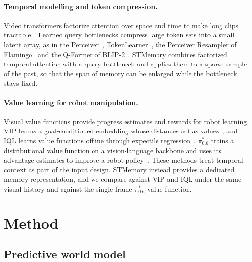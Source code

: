 \documentclass[10pt,a4paper]{article}
\begin{document}
\paragraph{Temporal modelling and token compression.}
Video transformers factorize attention over space and time to make long clips tractable~\citep{arnab2021vivit,bertasius2021timesformer}. Learned query bottlenecks compress large token sets into a small latent array, as in the Perceiver~\citep{jaegle2021perceiver}, TokenLearner~\citep{ryoo2021tokenlearner}, the Perceiver Resampler of Flamingo~\citep{alayrac2022flamingo} and the Q-Former of BLIP-2~\citep{li2023blip2}. STMemory combines factorized temporal attention with a query bottleneck and applies them to a sparse sample of the past, so that the span of memory can be enlarged while the bottleneck stays fixed.

\paragraph{Value learning for robot manipulation.}
Visual value functions provide progress estimates and rewards for robot learning. VIP learns a goal-conditioned embedding whose distances act as values~\citep{ma2023vip}, and IQL learns value functions offline through expectile regression~\citep{kostrikov2022iql}. $\pi^{*}_{0.6}$ trains a distributional value function on a vision-language backbone and uses its advantage estimates to improve a robot policy~\citep{pistar06}. These methods treat temporal context as part of the input design. STMemory instead provides a dedicated memory representation, and we compare against VIP and IQL under the same visual history and against the single-frame $\pi^{*}_{0.6}$ value function.

\section{Method}

\subsection{Predictive world model}
\end{document}
